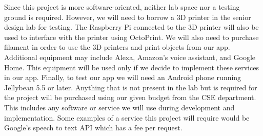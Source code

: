 Since this project is more software-oriented, neither lab space nor a testing ground is required. However, we will need to borrow a 3D printer in the senior design lab for testing. The Raspberry Pi connected to the 3D printer will also be used to interface with the printer using OctoPrint. We will also need to purchase filament in order to use the 3D printers and print objects from our app. Additional equipment may include Alexa, Amazon's voice assistant, and Google Home. This equipment will be used only if we decide to implement these services in our app. Finally, to test our app we will need an Android phone running Jellybean 5.5 or later. Anything that is not present in the lab but is required for the project will be purchased using our given budget from the CSE department. This includes any software or service we will use during development and implementation. Some examples of a service this project will require would be Google's speech to text API which has a fee per request.





